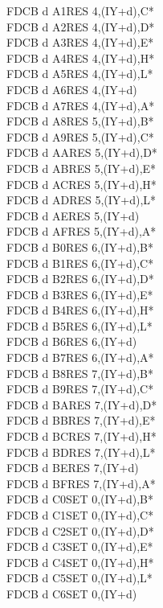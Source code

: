 \documentclass[oneside,a4paper]{book}
\begin{document}
\begin{multicols}{3}
{\begin{tabbing}
FDCB d A1\>RES 4,(IY+d),C*\\
FDCB d A2\>RES 4,(IY+d),D*\\
FDCB d A3\>RES 4,(IY+d),E*\\
FDCB d A4\>RES 4,(IY+d),H*\\
FDCB d A5\>RES 4,(IY+d),L*\\
FDCB d A6\>RES 4,(IY+d)\\
FDCB d A7\>RES 4,(IY+d),A*\\
FDCB d A8\>RES 5,(IY+d),B*\\
FDCB d A9\>RES 5,(IY+d),C*\\
FDCB d AA\>RES 5,(IY+d),D*\\
FDCB d AB\>RES 5,(IY+d),E*\\
FDCB d AC\>RES 5,(IY+d),H*\\
FDCB d AD\>RES 5,(IY+d),L*\\
FDCB d AE\>RES 5,(IY+d)\\
FDCB d AF\>RES 5,(IY+d),A*\\
FDCB d B0\>RES 6,(IY+d),B*\\
FDCB d B1\>RES 6,(IY+d),C*\\
FDCB d B2\>RES 6,(IY+d),D*\\
FDCB d B3\>RES 6,(IY+d),E*\\
FDCB d B4\>RES 6,(IY+d),H*\\
FDCB d B5\>RES 6,(IY+d),L*\\
FDCB d B6\>RES 6,(IY+d)\\
FDCB d B7\>RES 6,(IY+d),A*\\
FDCB d B8\>RES 7,(IY+d),B*\\
FDCB d B9\>RES 7,(IY+d),C*\\
FDCB d BA\>RES 7,(IY+d),D*\\
FDCB d BB\>RES 7,(IY+d),E*\\
FDCB d BC\>RES 7,(IY+d),H*\\
FDCB d BD\>RES 7,(IY+d),L*\\
FDCB d BE\>RES 7,(IY+d)\\
FDCB d BF\>RES 7,(IY+d),A*\\
FDCB d C0\>SET 0,(IY+d),B*\\
FDCB d C1\>SET 0,(IY+d),C*\\
FDCB d C2\>SET 0,(IY+d),D*\\
FDCB d C3\>SET 0,(IY+d),E*\\
FDCB d C4\>SET 0,(IY+d),H*\\
FDCB d C5\>SET 0,(IY+d),L*\\
FDCB d C6\>SET 0,(IY+d)\\

\end{tabbing}}
\end{multicols}
\end{document}
